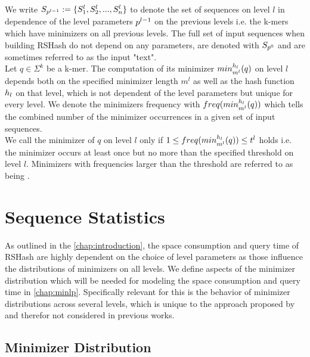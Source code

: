 \documentclass[a4paper,titlepage,onecolumn,oneside,12pt,nenglish,titlepage=firstiscover]{scrbook}
\theoremstyle{plain} %
\theoremstyle{definition} %
\theoremstyle{remark} %
\theoremstyle{plain}
\newcommand{\minimizerLength}{m}
\newcommand{\threshold}{t}
\newcommand{\level}{l}
\newcommand{\kmer}{q}
\begin{document}
We write $\sequences{\level-1} := \{S^\level_1,S^\level_2,...,S^\level_n\}$ to denote the set of sequences on level $\level$ in dependence of the level parameters $\levelParameters{\level-1}$ on the previous levels i.e. the k-mers which have \infrequent minimizers on all previous levels. The full set of input sequences when building RSHash do not depend on any parameters, are denoted with $S_{p^{0}}$ and are sometimes referred to as the input "text".\\
Let $\kmer \in \Sigma^{k}$ be a k-mer. The computation of its minimizer $\minimizerOf{\kmer}{\level}$ on level $l$ depends both on the specified minimizer length $\minimizerLength^\level$ as well as the hash function $\hashfunction{\level}$ on that level, which is not dependent of the level parameters but unique for every level. We denote the minimizers frequency with $\frequencyOf{\minimizerOf{\kmer}{\level}}$ which tells the combined number of the minimizer occurrences in a given set of input sequences.\\
We call the minimizer of $\kmer$ \infrequent on level $\level$ only if $1 \leq \frequencyOf{\minimizerOf{\kmer}{\level}} \leq \threshold^\level$ holds i.e. the minimizer occurs at least once but no more than the specified threshold on level $\level$. Minimizers with frequencies larger than the threshold are referred to as being \frequent.

\chapter{Sequence Statistics}\label{chap:sequenceStatistics}
As outlined in the \cref{chap:introduction}, the space consumption and query time of RSHash are highly dependent on the choice of level parameters as those influence the distributions of minimizers on all levels. We define aspects of the minimizer distribution which will be needed for modeling the space consumption and query time in \cref{chap:minlp}. Specifically relevant for this is the behavior of minimizer distributions across several levels, which is unique to the approach proposed by \citet{schulte-mattler_rshash_2026} and therefor not considered in previous works.

\section{Minimizer Distribution} \label{sec:minimizerDistribution_severalLevels}
\newcommand{\distinctMinimizers}[1]{\mathcal{M}_{\levelParameters{#1-1}, \minimizerLength^{#1}}}
\newcommand{\distinctKmers}[1]{\mathcal{K}_{\levelParameters{#1-1}}}
\end{document}
